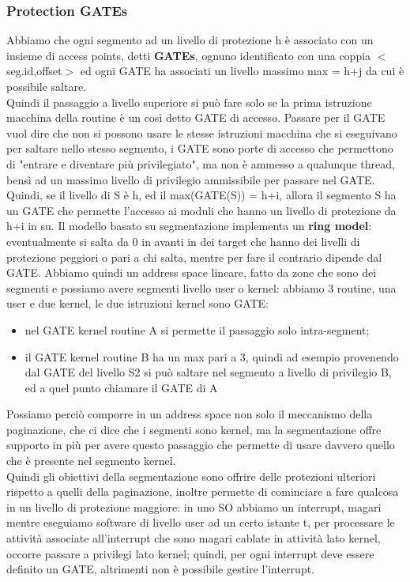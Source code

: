\documentclass[12pt, oneside]{extbook}
\begin{document}
\subsubsection{Protection GATEs} 
Abbiamo che ogni segmento ad un livello di protezione h è  associato con un insieme di access points, detti \textbf{GATEs}, ognuno identificato con una coppia $<$seg.id,offset$>$ ed ogni GATE ha associati un livello massimo max = h+j da cui è possibile saltare.\\ Quindi il passaggio a livello superiore si può fare solo se la prima istruzione macchina della routine è un così detto GATE di accesso. Passare per il GATE vuol dire che non si possono usare le stesse istruzioni macchina che si eseguivano per saltare nello stesso segmento, i GATE sono porte di accesso che permettono di "entrare e diventare più privilegiato", ma non è ammesso a qualunque thread, bensì ad un massimo livello di privilegio ammissibile per passare nel GATE.\\ Quindi, se il livello di S è h, ed il max(GATE(S)) = h+i, allora il segmento S ha un GATE che permette l'accesso ai moduli che hanno un livello di protezione da h+i in su. Il modello basato su segmentazione implementa un \textbf{ring model}:
eventualmente si salta da 0 in avanti in dei target che hanno dei livelli di protezione peggiori o pari a chi salta, mentre per fare il contrario dipende dal GATE. Abbiamo quindi un address space lineare, fatto da zone che sono dei segmenti e possiamo avere segmenti livello user o kernel:
abbiamo 3 routine, una user e due kernel, le due istruzioni kernel sono GATE:
\begin{itemize}
\item nel GATE kernel routine A si permette il passaggio solo intra-segment;
\item il GATE kernel routine B ha un max pari a 3, quindi ad esempio provenendo dal GATE del livello S2 si può saltare nel segmento a livello di privilegio B, ed a quel punto chiamare il GATE di A
\end{itemize}
Possiamo perciò comporre in un address space non solo il meccanismo della paginazione, che ci dice che i segmenti sono kernel, ma la segmentazione offre supporto in più per avere questo passaggio che permette di usare davvero quello che è presente nel segmento kernel.\\ Quindi gli obiettivi della segmentazione sono offrire delle protezioni ulteriori rispetto a quelli della paginazione, inoltre permette di cominciare a fare qualcosa in un livello di protezione maggiore: in uno SO abbiamo un interrupt, magari mentre eseguiamo software di livello user ad un certo istante t, per processare le attività associate all'interrupt che sono magari cablate in attività lato kernel, occorre passare a privilegi lato kernel; quindi, per ogni interrupt deve essere definito un GATE, altrimenti non è possibile gestire l'interrupt.\\ 
\end{document}

